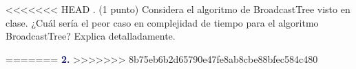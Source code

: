 <<<<<<< HEAD
. (1 punto) Considera el algoritmo de BroadcastTree visto en clase. ¿Cuál sería el peor caso en complejidad de tiempo para el algoritmo BroadcastTree? Explica detalladamente.  

=======
\newpage
\textbf{\textcolor{MidnightBlue}{2.}}
>>>>>>> 8b75eb6b2d65790e47fe8ab8cbe88bfec584c480

